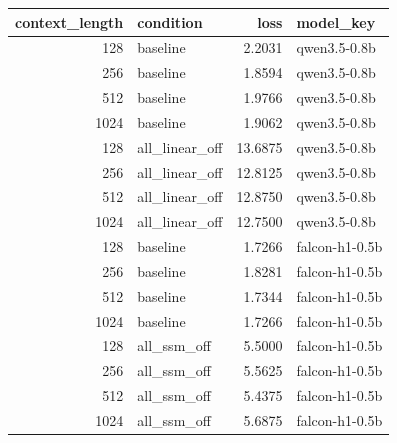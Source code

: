 \begin{tabular}{rlrl}
\toprule
context_length & condition & loss & model_key \\
\midrule
128 & baseline & 2.2031 & qwen3.5-0.8b \\
256 & baseline & 1.8594 & qwen3.5-0.8b \\
512 & baseline & 1.9766 & qwen3.5-0.8b \\
1024 & baseline & 1.9062 & qwen3.5-0.8b \\
128 & all_linear_off & 13.6875 & qwen3.5-0.8b \\
256 & all_linear_off & 12.8125 & qwen3.5-0.8b \\
512 & all_linear_off & 12.8750 & qwen3.5-0.8b \\
1024 & all_linear_off & 12.7500 & qwen3.5-0.8b \\
128 & baseline & 1.7266 & falcon-h1-0.5b \\
256 & baseline & 1.8281 & falcon-h1-0.5b \\
512 & baseline & 1.7344 & falcon-h1-0.5b \\
1024 & baseline & 1.7266 & falcon-h1-0.5b \\
128 & all_ssm_off & 5.5000 & falcon-h1-0.5b \\
256 & all_ssm_off & 5.5625 & falcon-h1-0.5b \\
512 & all_ssm_off & 5.4375 & falcon-h1-0.5b \\
1024 & all_ssm_off & 5.6875 & falcon-h1-0.5b \\
\bottomrule
\end{tabular}
